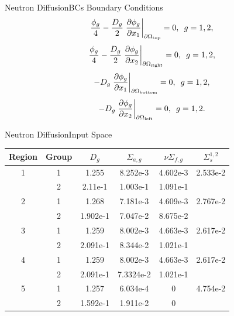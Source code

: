 \documentclass{beamer}
\begin{document}
\begin{frame}{Neutron Diffusion}{BCs}%
  Boundary Conditions
  \begin{equation}
    \frac{\phi_g}{4}-\frac{D_g}{2}\eval{\pdv{\phi_g}{x_1}}_{\partial \Omega_\text{top}}=0,\hspace{5pt} g=1,2,
  \end{equation}
  \begin{equation}
    \frac{\phi_g}{4}-\frac{D_g}{2}\eval{\pdv{\phi_g}{x_2}}_{\partial \Omega_\text{right}}=0,\hspace{5pt} g=1,2,
  \end{equation}
  \begin{equation}
    -D_g\eval{\pdv{\phi_g}{x_1}}_{\partial \Omega_\text{bottom}}=0,\hspace{5pt} g=1,2,
  \end{equation}
  \begin{equation}
    -D_g\eval{\pdv{\phi_g}{x_2}}_{\partial \Omega_\text{left}}=0,\hspace{5pt} g=1,2.
  \end{equation}
\end{frame}

\begin{frame}{Neutron Diffusion}{Input Space}%
  \begin{table}[h]
    \centering
    \begin{tabular}{c c | c c c c}
      Region & Group & $D_g$ & $\Sigma_{a,g}$ & $\nu\Sigma_{f,g}$ & $\Sigma_s^{1,2}$ \\ \hline
      1 & 1 & 1.255 & 8.252e-3 & 4.602e-3 & 2.533e-2 \\
       & 2 & 2.11e-1 & 1.003e-1 & 1.091e-1 & \\ \hline
       2 & 1 & 1.268 & 7.181e-3 & 4.609e-3 & 2.767e-2 \\
        & 2 & 1.902e-1 & 7.047e-2 & 8.675e-2 & \\ \hline
        3 & 1 & 1.259 & 8.002e-3 & 4.663e-3 & 2.617e-2 \\
         & 2 & 2.091e-1 & 8.344e-2 & 1.021e-1 & \\ \hline
         4 & 1 & 1.259 & 8.002e-3 & 4.663e-3 & 2.617e-2 \\
          & 2 & 2.091e-1 & 7.3324e-2 & 1.021e-1 & \\ \hline
          5 & 1 & 1.257 & 6.034e-4 & 0 & 4.754e-2 \\
           & 2 & 1.592e-1 & 1.911e-2 & 0 &
         \end{tabular}
       \end{table}
\end{frame}
\end{document}

